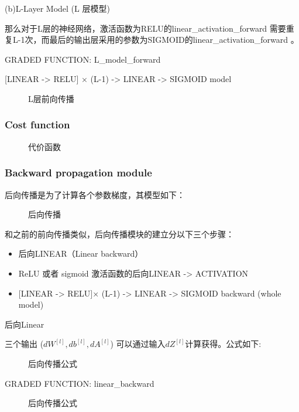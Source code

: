 \documentclass[UTF8]{ctexart}
\begin{document}
\newpage
(b)L-Layer Model (L 层模型)

那么对于L层的神经网络，激活函数为RELU的linear\_activation\_forward 需要重复L-1次，而最后的输出层采用的参数为SIGMOID的linear\_activation\_forward 。

GRADED FUNCTION: L\_model\_forward

[LINEAR -> RELU] × (L-1) -> LINEAR -> SIGMOID model

\begin{figure}[htb]
 \caption{L层前向传播}
 \label{fig:5}
 \end{figure}

 \subsubsection{Cost function}
 \begin{figure}[htb]
  \caption{代价函数}
  \label{fig:6}
  \end{figure}

\subsubsection{Backward propagation module}
后向传播是为了计算各个参数梯度，其模型如下：

\newpage

\begin{figure}[htb]
 \caption{后向传播}
 \label{fig:7}
 \end{figure}


 和之前的前向传播类似，后向传播模块的建立分以下三个步骤：
\begin{itemize}
  \item 后向LINEAR（Linear backward）
  \item ReLU 或者 sigmoid 激活函数的后向LINEAR -> ACTIVATION
  \item $[$LINEAR -> RELU$]$× (L-1) -> LINEAR -> SIGMOID backward (whole model)
\end{itemize}

 后向Linear

 三个输出 ($dW^{[l]},db^{[l]},dA^{[l]}$) 可以通过输入$dZ^{[l]}$计算获得。公式如下:
 \begin{figure}[htb]
  \caption{后向传播公式}
  \label{fig:8}
  \end{figure}

GRADED FUNCTION: linear\_backward
\begin{figure}[htb]
 \caption{后向传播公式}
 \label{fig:9}
 \end{figure}
\end{document}
